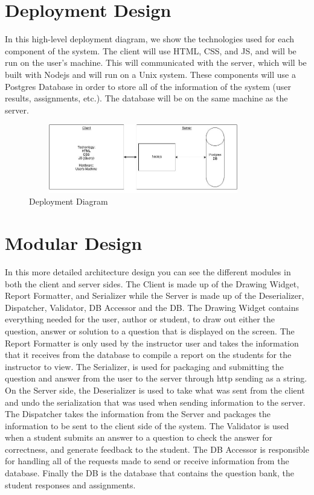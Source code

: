 \chapter{Deployment Design}
      In this high-level deployment diagram, we show the technologies used for each component of the system. The client will use HTML, CSS, and JS, and will be run on the user’s machine. This will communicated with the server, which will be built with Nodejs and will run on a Unix system. These components will use a Postgres Database in order to store all of the information of the system (user results, assignments, etc.). The database will be on the same machine as the server.
                        \begin{figure}[H]
            \centerline{\includegraphics[height=3cm, width=10cm]{Deployment.jpg}}
            \caption{Deployment Diagram}
    \end{figure}
    
\chapter{Modular Design}
In this more detailed architecture design you can see the different modules in both the client and server sides.  The Client is made up of the Drawing Widget, Report Formatter, and Serializer while the Server is made up of the Deserializer, Dispatcher, Validator, DB Accessor and the DB.  The Drawing Widget contains everything needed for the user, author or student, to draw out either the question, answer or solution to a question that is displayed on the screen.  The Report Formatter is only used by the instructor user and takes the information that it receives from the database to compile a report on the students for the instructor to view.  The Serializer, is used for packaging and submitting the question and answer from the user to the server through http sending as a string.  On the Server side, the Deserializer is used to take what was sent from the client and undo the serialization that was used when sending information to the server.  The Dispatcher takes the information from the Server and packages the information to be sent to the client side of the system.  The Validator is used when a student submits an answer to a question to check the answer for correctness, and generate feedback to the student.  The DB Accessor is responsible for handling all of the requests made to send or receive information from the database.  Finally the DB is the database that contains the question bank, the student responses and assignments.  
 

